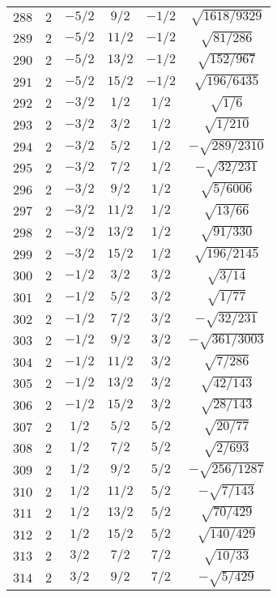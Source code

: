 \begin{table}
\begin{center}
\begin{tabular}{|c|c|c|c|c|c|}
$288$ & $2$ & $-5/2$ & $9/2$ & $-1/2$ & $\sqrt{1618/9329}$ \\ 
$289$ & $2$ & $-5/2$ & $11/2$ & $-1/2$ & $\sqrt{81/286}$ \\ 
$290$ & $2$ & $-5/2$ & $13/2$ & $-1/2$ & $\sqrt{152/967}$ \\ 
$291$ & $2$ & $-5/2$ & $15/2$ & $-1/2$ & $\sqrt{196/6435}$ \\ 
$292$ & $2$ & $-3/2$ & $1/2$ & $1/2$ & $\sqrt{1/6}$ \\ 
$293$ & $2$ & $-3/2$ & $3/2$ & $1/2$ & $\sqrt{1/210}$ \\ 
$294$ & $2$ & $-3/2$ & $5/2$ & $1/2$ & $-\sqrt{289/2310}$ \\ 
$295$ & $2$ & $-3/2$ & $7/2$ & $1/2$ & $-\sqrt{32/231}$ \\ 
$296$ & $2$ & $-3/2$ & $9/2$ & $1/2$ & $\sqrt{5/6006}$ \\ 
$297$ & $2$ & $-3/2$ & $11/2$ & $1/2$ & $\sqrt{13/66}$ \\ 
$298$ & $2$ & $-3/2$ & $13/2$ & $1/2$ & $\sqrt{91/330}$ \\ 
$299$ & $2$ & $-3/2$ & $15/2$ & $1/2$ & $\sqrt{196/2145}$ \\ 
$300$ & $2$ & $-1/2$ & $3/2$ & $3/2$ & $\sqrt{3/14}$ \\ 
$301$ & $2$ & $-1/2$ & $5/2$ & $3/2$ & $\sqrt{1/77}$ \\ 
$302$ & $2$ & $-1/2$ & $7/2$ & $3/2$ & $-\sqrt{32/231}$ \\ 
$303$ & $2$ & $-1/2$ & $9/2$ & $3/2$ & $-\sqrt{361/3003}$ \\ 
$304$ & $2$ & $-1/2$ & $11/2$ & $3/2$ & $\sqrt{7/286}$ \\ 
$305$ & $2$ & $-1/2$ & $13/2$ & $3/2$ & $\sqrt{42/143}$ \\ 
$306$ & $2$ & $-1/2$ & $15/2$ & $3/2$ & $\sqrt{28/143}$ \\ 
$307$ & $2$ & $1/2$ & $5/2$ & $5/2$ & $\sqrt{20/77}$ \\ 
$308$ & $2$ & $1/2$ & $7/2$ & $5/2$ & $\sqrt{2/693}$ \\ 
$309$ & $2$ & $1/2$ & $9/2$ & $5/2$ & $-\sqrt{256/1287}$ \\ 
$310$ & $2$ & $1/2$ & $11/2$ & $5/2$ & $-\sqrt{7/143}$ \\ 
$311$ & $2$ & $1/2$ & $13/2$ & $5/2$ & $\sqrt{70/429}$ \\ 
$312$ & $2$ & $1/2$ & $15/2$ & $5/2$ & $\sqrt{140/429}$ \\ 
$313$ & $2$ & $3/2$ & $7/2$ & $7/2$ & $\sqrt{10/33}$ \\ 
$314$ & $2$ & $3/2$ & $9/2$ & $7/2$ & $-\sqrt{5/429}$ \\ 

\end{tabular}
\end{center}
\end{table}
